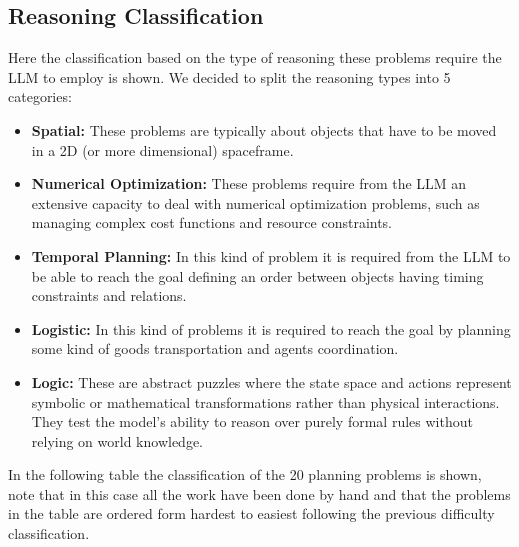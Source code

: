 \documentclass[a4paper]{article}
\begin{document}
    \subsection{Reasoning Classification}
    Here the classification based on the type of reasoning these problems require the LLM to employ is shown. We decided to split the reasoning types into 5 categories:
    \begin{itemize}
        \item \textbf{Spatial:} These problems are typically about objects that have to be moved in a 2D (or more dimensional) spaceframe.
        \item \textbf{Numerical Optimization:} These problems require from the LLM an extensive capacity to deal with numerical optimization problems, such as managing complex cost functions and resource constraints.
        \item \textbf{Temporal Planning:} In this kind of problem it is required from the LLM to be able to reach the goal defining an order between objects having timing constraints and relations.
        \item \textbf{Logistic:} In this kind of problems it is required to reach the goal by planning some kind of goods transportation and agents coordination.
        \item \textbf{Logic:} These are abstract puzzles where the state space and actions represent symbolic or mathematical transformations rather than physical interactions. They test the model's ability to reason over purely formal rules without relying on world knowledge.
    \end{itemize}

    In the following table the classification of the 20 planning problems is shown, note that in this case all the work have been done by hand and that the problems in the table are ordered form hardest to easiest following the previous difficulty classification.
    
\end{document}
